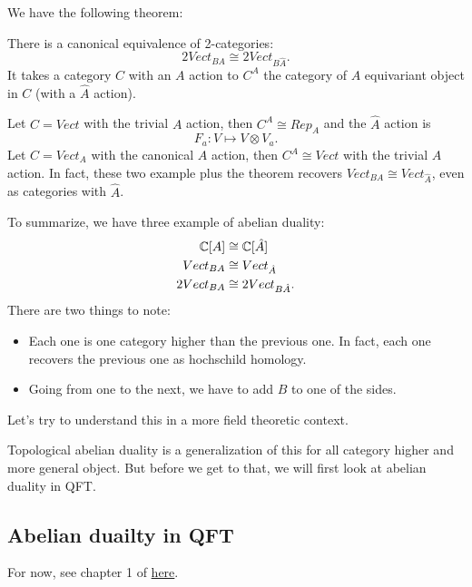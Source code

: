 \documentclass[./main]{subfiles}
\begin{document}
We have the following theorem:
\begin{theorem}
There is a canonical equivalence of 2-categories:
    \begin{equation}
        2Vect_{BA} \cong 2Vect_{B\hat{A}}.
    \end{equation}
It takes a category $C$ with an $A$ action to $C^A$ the category of $A$ equivariant object in $C$ (with a $\hat{A}$ action).
\end{theorem}

\begin{example}
Let $C = Vect$ with the trivial $A$ action, then $C^A \cong Rep_A$ and the $\hat{A}$ action is 
\begin{equation}
    F_a: V \mapsto V \otimes V_a.
\end{equation}
Let $C = Vect_A$ with the canonical $A$ action, then $C^A \cong Vect$ with the trivial $\hat{A}$ action.
In fact, these two example plus the theorem recovers $Vect_{BA} \cong Vect_{\hat{A}}$, even as categories with $\hat{A}$.
\end{example}

To summarize, we have three example of abelian duality: 
\begin{align}
    \mathbb{C}[A] &\cong \mathbb{C}[\hat{A}] \\
    Vect_{BA} &\cong Vect_{\hat{A}} \\ 
    2Vect_{BA} &\cong 2Vect_{B\hat{A}}.
\end{align}
There are two things to note:
\begin{itemize}
    \item Each one is one category higher than the previous one. In fact, each one recovers the previous one as hochschild homology.
    \item Going from one to the next, we have to add $B$ to one of the sides.
\end{itemize}

Let's try to understand this in a more field theoretic context. 

Topological abelian duality is a generalization of this for all category higher and more general object.
But before we get to that, we will first look at abelian duality in QFT.

\subsection{Abelian duailty in QFT}
For now, see chapter 1 of \href{https://leon2k2k2k.github.io/Research/senior_thesis.pdf}{here}.
\end{document}
